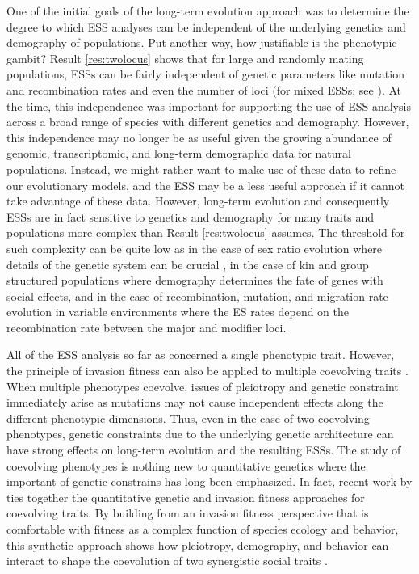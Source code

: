 \documentclass[11pt]{article}
\begin{document}
One of the initial goals of the long-term evolution approach was to determine the degree to which ESS analyses can be independent of the underlying genetics and demography of populations. Put another way, how justifiable is the phenotypic gambit? Result \ref{res:twolocus} shows that for large and randomly mating populations, ESSs can be fairly independent of genetic parameters like mutation and recombination rates and even the number of loci (for mixed ESSs; see \cite{Eshel:Feldman:1998,Eshel:Feldman:2001}). At the time, this independence was important for supporting the use of ESS analysis across a broad range of species with different genetics and demography. However, this independence may no longer be as useful given the growing abundance of genomic, transcriptomic, and long-term demographic data for natural populations. Instead, we might rather want to make use of these data to refine our evolutionary models, and the ESS may be a less useful approach if it cannot take advantage of these data. However, long-term evolution and consequently ESSs are in fact sensitive to genetics and demography for many traits and populations more complex than Result \ref{res:twolocus} assumes. The threshold for such complexity can be quite low as in the case of sex ratio evolution where details of the genetic system can be crucial \cite{Hamilton:1967,Eshel:Feldman:1982a,Wu:1983,Taylor:Jaenike:2002}, in the case of kin and group structured populations where demography determines the fate of genes with social effects, and in the case of recombination, mutation, and migration rate evolution in variable environments where the ES rates depend on the recombination rate between the major and modifier loci.

All of the ESS analysis so far as concerned a single phenotypic trait. However, the principle of invasion fitness can also be applied to multiple coevolving traits \cite{Leimar:2009,Mullon:Keller:2016,Mullon:Lehmann:2019}. When multiple phenotypes coevolve, issues of pleiotropy and genetic constraint immediately arise as mutations may not cause independent effects along the different phenotypic dimensions. Thus, even in the case of two coevolving phenotypes, genetic constraints due to the underlying genetic architecture can have strong effects on long-term evolution and the resulting ESSs. The study of coevolving phenotypes is nothing new to quantitative genetics \cite{Lande:1979,Lande:Arnold:1983,Phillips:Arnold:1989} where the important of genetic constrains has long been emphasized. In fact, recent work by \citeauthor{Mullon:Lehmann:2019} \cite{Mullon:Lehmann:2019} ties together the quantitative genetic and invasion fitness approaches for coevolving traits. By building from an invasion fitness perspective that is comfortable with fitness as a complex function of species ecology and behavior, this synthetic approach shows how pleiotropy, demography, and behavior can interact to shape the coevolution of two synergistic social traits \cite{Mullon:Lehmann:2019}.
\end{document}
